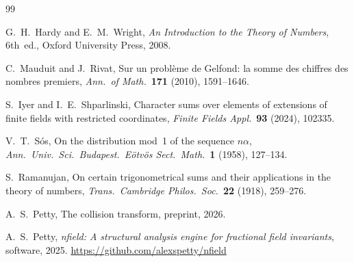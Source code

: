 \documentclass[12pt]{amsart}
\theoremstyle{definition}
\theoremstyle{remark}
\begin{document}
\begin{thebibliography}{99}

G.~H.~Hardy and E.~M.~Wright,
\emph{An Introduction to the Theory of Numbers},
6th~ed., Oxford University Press, 2008.

C.~Mauduit and J.~Rivat,
Sur un probl\`eme de Gelfond: la somme des chiffres des
nombres premiers,
\emph{Ann.\ of Math.}\ \textbf{171} (2010), 1591--1646.

S.~Iyer and I.~E.~Shparlinski,
Character sums over elements of extensions of finite fields
with restricted coordinates,
\emph{Finite Fields Appl.}\ \textbf{93} (2024), 102335.

V.~T.~S\'os,
On the distribution mod~1 of the sequence $n\alpha$,
\emph{Ann.\ Univ.\ Sci.\ Budapest.\ E\"otv\"os Sect.\
Math.}\ \textbf{1} (1958), 127--134.

S.~Ramanujan,
On certain trigonometrical sums and their applications in
the theory of numbers,
\emph{Trans.\ Cambridge Philos.\ Soc.}\ \textbf{22}
(1918), 259--276.

A.~S.~Petty,
The collision transform,
preprint, 2026.

A.~S.~Petty,
\emph{nfield: A structural analysis engine for fractional
field invariants},
software, 2025.
\url{https://github.com/alexspetty/nfield}

\end{thebibliography}
\end{document}
